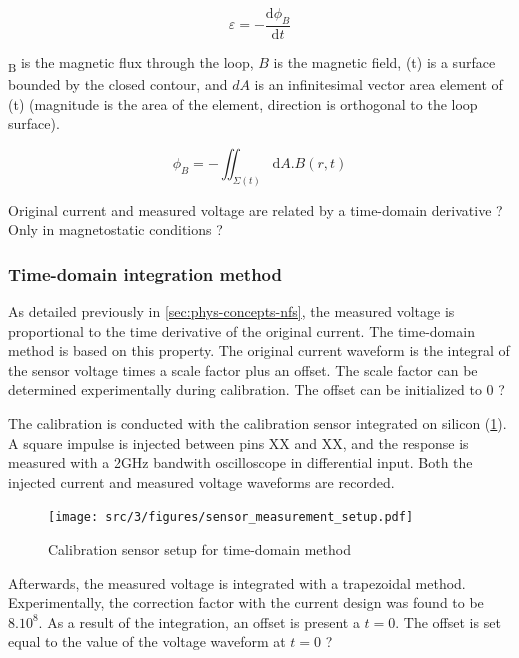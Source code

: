 \begin{equation} \label{eq:faraday}
  \varepsilon = - \frac{\mathrm{d} \phi _{B}}{\mathrm{d} t}
\end{equation}


\textPhi{}\textsubscript{B} is the magnetic flux through the loop, $B$ is the magnetic field, \textSigma{}(t) is a surface bounded by the closed contour,
and $dA$ is an infinitesimal vector area element of \textSigma{}(t) (magnitude is the area of the element, direction is orthogonal to the loop surface).

\begin{equation} \label{eq:phi}
  \phi _{B} = - \iint_{\Sigma(t)} \mathrm{d}A . B(r,t)
\end{equation}

Original current and measured voltage are related by a time-domain derivative ? Only in magnetostatic conditions ?

\subsubsection{Time-domain integration method}

As detailed previously in \ref{sec:phys-concepts-nfs}, the measured voltage is proportional to the time derivative of the original current.
The time-domain method is based on this property.
The original current waveform is the integral of the sensor voltage times a scale factor plus an offset.
The scale factor can be determined experimentally during calibration.
The offset can be initialized to 0 ?

The calibration is conducted with the calibration sensor integrated on silicon (\ref{fig:calibration-sensor}).
A square impulse is injected between pins XX and XX, and the response is measured with a 2GHz bandwith oscilloscope in differential input.
Both the injected current and measured voltage waveforms are recorded.

\begin{figure}[!htbp]
  \centering
  \texttt{[image: src/3/figures/sensor\_measurement\_setup.pdf]}
  \caption{Calibration sensor setup for time-domain method}
  \label{fig:calibration-sensor}
\end{figure}

Afterwards, the measured voltage is integrated with a trapezoidal method.
Experimentally, the correction factor with the current design was found to be $8.10^8$.
As a result of the integration, an offset is present a $t=0$.
The offset is set equal to the value of the voltage waveform at $t=0$ ?

